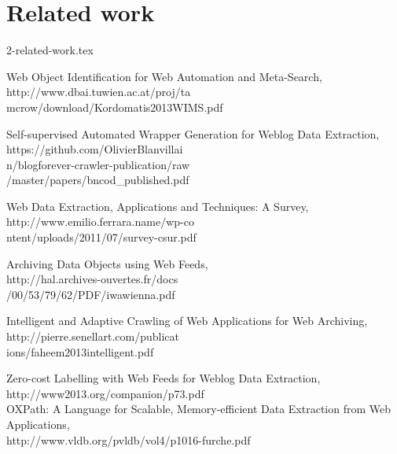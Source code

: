 \section{Related work}
2-related-work.tex

Web Object Identification for Web Automation and Meta-Search,
\\
http://www.dbai.tuwien.ac.at/proj/ta\\
mcrow/download/Kordomatis2013WIMS.pdf

Self-supervised Automated Wrapper Generation for Weblog Data Extraction,
\\
https://github.com/OlivierBlanvillai\\
n/blogforever-crawler-publication/raw\\
/master/papers/bncod\_published.pdf

Web Data Extraction, Applications and Techniques: A Survey,
\\
http://www.emilio.ferrara.name/wp-co\\
ntent/uploads/2011/07/survey-csur.pdf

Archiving Data Objects using Web Feeds,
\\
http://hal.archives-ouvertes.fr/docs\\
/00/53/79/62/PDF/iwawienna.pdf

Intelligent and Adaptive Crawling of Web Applications for Web Archiving,
\\
http://pierre.senellart.com/publicat\\
ions/faheem2013intelligent.pdf

Zero-cost Labelling with Web Feeds for Weblog Data Extraction,
\\
http://www2013.org/companion/p73.pdf\\


OXPath: A Language for Scalable, Memory-efficient Data Extraction from Web Applications,
\\
http://www.vldb.org/pvldb/vol4/p1016-furche.pdf
